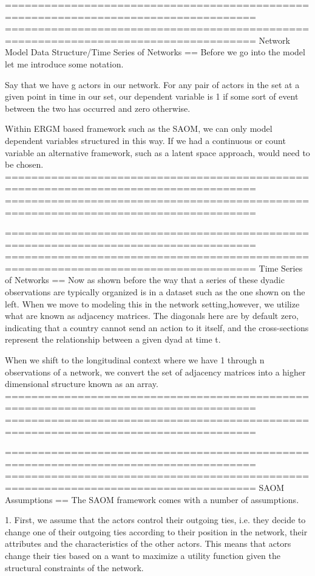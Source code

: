 ====================================================================================
====================================================================================
Network Model Data Structure/Time Series of Networks
==
Before we go into the model let me introduce some notation. 

Say that we have g actors in our network. For any pair of actors in the set at a given point in time in our set, our dependent variable is 1 if some sort of event between the two has occurred and zero otherwise. 

Within ERGM based framework such as the SAOM, we can only model dependent variables structured in this way. If we had a continuous or count variable an alternative framework, such as a latent space approach, would need to be chosen.
====================================================================================
====================================================================================

====================================================================================
====================================================================================
Time Series of Networks
==
Now as shown before the way that a series of these dyadic observations are typically organized is in a dataset such as the one shown on the left. When we move to modeling this in the network setting,however, we utilize what are known as adjacency matrices. The diagonals here are by default zero, indicating that a country cannot send an action to it itself, and the cross-sections represent the relationship between a given dyad at time t. 

When we shift to the longitudinal context where we have 1 through n observations of a network, we convert the set of adjacency matrices into a higher dimensional structure known as an array.
====================================================================================
====================================================================================

====================================================================================
====================================================================================
SAOM Assumptions
==
The SAOM framework comes with a number of assumptions. 

1. First, we assume that the actors control their outgoing ties, i.e. they decide to change one of their outgoing ties according to their position in the network, their attributes and the characteristics of the other actors. This means that actors change their ties based on a want to maximize a utility function given the structural constraints of the network.

